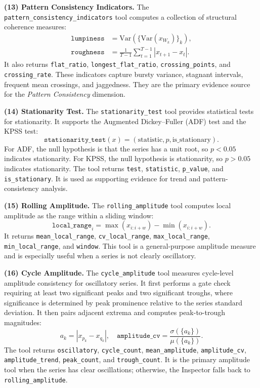 \documentclass{article}
\begin{document}
\textbf{(13) Pattern Consistency Indicators.}
The \texttt{pattern\_consistency\_indicators} tool computes a collection of structural coherence measures:
\begin{align}
\texttt{lumpiness} &= \mathrm{Var}\left(\{\mathrm{Var}(x_{W_k})\}_k\right),\\
\texttt{roughness} &= \frac{1}{T-1}\sum_{t=1}^{T-1}|x_{t+1}-x_t|.
\end{align}
It also returns \texttt{flat\_ratio}, \texttt{longest\_flat\_ratio}, \texttt{crossing\_points}, and \texttt{crossing\_rate}. These indicators capture bursty variance, stagnant intervals, frequent mean crossings, and jaggedness. They are the primary evidence source for the \textit{Pattern Consistency} dimension.

\textbf{(14) Stationarity Test.}
The \texttt{stationarity\_test} tool provides statistical tests for stationarity. It supports the Augmented Dickey--Fuller (ADF) test and the KPSS test:
\begin{equation}
\texttt{stationarity\_test}(x)=(\mathrm{statistic}, p, \mathrm{is\_stationary}).
\end{equation}
For ADF, the null hypothesis is that the series has a unit root, so $p<0.05$ indicates stationarity. For KPSS, the null hypothesis is stationarity, so $p>0.05$ indicates stationarity. The tool returns \texttt{test}, \texttt{statistic}, \texttt{p\_value}, and \texttt{is\_stationary}. It is used as supporting evidence for trend and pattern-consistency analysis.

\textbf{(15) Rolling Amplitude.}
The \texttt{rolling\_amplitude} tool computes local amplitude as the range within a sliding window:
\begin{equation}
\texttt{local\_range}_i = \max(x_{i:i+w}) - \min(x_{i:i+w}).
\end{equation}
It returns \texttt{mean\_local\_range}, \texttt{cv\_local\_range}, \texttt{max\_local\_range}, \texttt{min\_local\_range}, and \texttt{window}. This tool is a general-purpose amplitude measure and is especially useful when a series is not clearly oscillatory.

\textbf{(16) Cycle Amplitude.}
The \texttt{cycle\_amplitude} tool measures cycle-level amplitude consistency for oscillatory series. It first performs a gate check requiring at least two significant peaks and two significant troughs, where significance is determined by peak prominence relative to the series standard deviation. It then pairs adjacent extrema and computes peak-to-trough magnitudes:
\begin{equation}
a_k = |x_{p_k} - x_{q_k}|,\quad
\texttt{amplitude\_cv}=\frac{\sigma(\{a_k\})}{\mu(\{a_k\})}.
\end{equation}
The tool returns \texttt{oscillatory}, \texttt{cycle\_count}, \texttt{mean\_amplitude}, \texttt{amplitude\_cv}, \texttt{amplitude\_trend}, \texttt{peak\_count}, and \texttt{trough\_count}. It is the primary amplitude tool when the series has clear oscillations; otherwise, the Inspector falls back to \texttt{rolling\_amplitude}.
\end{document}
